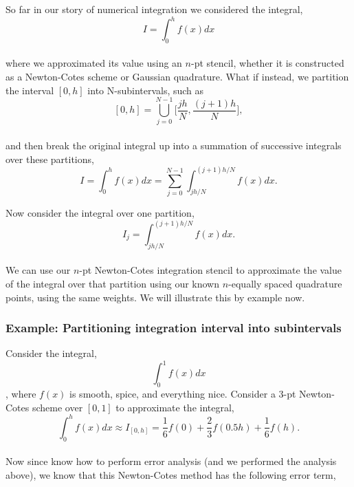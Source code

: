 \documentclass[paper=a4, fontsize=11pt]{scrartcl} %
\numberwithin{equation}{section} %
\numberwithin{figure}{section} %
\numberwithin{table}{section} %
\begin{document}
 $ $\\
 
 So far in  our story of numerical integration we considered the integral,\\ $$I = \int_0^h f(x) dx$$\\ where we approximated its value using an $n$-pt stencil, whether it is constructed as a Newton-Cotes scheme or Gaussian quadrature. What if instead, we partition the interval $[0,h]$ into N-subintervals, such as\\ 
 
 $$[0,h] = \displaystyle\bigcup_{j=0}^{N-1} \Bigg[\frac{jh}{N},\frac{(j+1)h}{N}\Bigg],$$  \\
 
 and then break the original integral up into a summation of successive integrals over these partitions, \\
 
 $$I = \int_0^h f(x) dx = \sum_{j=0}^{N-1} \int_{jh/N}^{(j+1)h/N} f(x) dx.$$
 
 Now consider the integral over one partition,\\ 
 
 $$I_j = \int_{jh/N}^{(j+1)h/N} f(x) dx.$$\\
 
 We can use our $n$-pt Newton-Cotes integration stencil to approximate the value of the integral over that partition using our known $n$-equally spaced quadrature points, using the same weights. We will illustrate this by example now. \\
 
 \subsubsection{Example: Partitioning integration interval into subintervals}
 
 $ $\\
 
 Consider the integral, $$\int_0^1 f(x) dx$$, where $f(x)$ is smooth, spice, and everything nice. Consider a $3$-pt Newton-Cotes scheme over $[0,1]$ to approximate the integral, \\
 
 $$\int_0^h f(x) dx \approx I_{[0,h]} = \frac{1}{6} f(0) + \frac{2}{3}  f(0.5h) + \frac{1}{6} f(h).$$\\
 
 Now since know how to perform error analysis (and we performed the analysis above), we know that this Newton-Cotes method has the following error term, 
 
\end{document}
